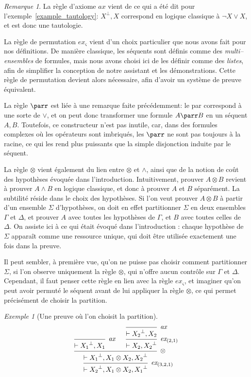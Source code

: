 \documentclass[11pt,a4paper]{article}
\theoremstyle{plain}
\theoremstyle{definition}
\theoremstyle{remark}
\newtheorem{remark}{Remarque}
\newtheorem{example}{Exemple}
\newcommand*{\orth}{^\perp}
\newcommand*{\tensor}{\otimes}
\newcommand*{\axv}[1]{\infer{0}[\ensuremath{\mathit{ax}}]{\vdash #1}}
\newcommand*{\tensorv}[1]{\infer{2}[\ensuremath{\tensor}]{\vdash #1}}
\newcommand*{\permv}[2]{\infer{1}[\ensuremath{\textit{ex}_{#1}}]{\vdash #2}}
\newcommand*{\someperm}{\varsigma}
\newcommand*{\sequent}{\Gamma}
\newcommand*{\sequentbis}{\Delta}
\begin{document}
\begin{remark}
    La règle d'axiome $\mathit{ax}$ vient de ce qui a été dit pour l'exemple~\ref{example_tautology}: $X\orth, X$ correspond en logique classique à $\neg X \lor X$, et est donc une tautologie.

    La règle de permutation $\textit{ex}_{\someperm}$ vient d'un choix particulier que nous avons fait pour nos définitions. De manière classique, les séquents sont définis comme des \textit{multi--ensembles} de formules, mais nous avons choisi ici de les définir comme des \textit{listes}, afin de simplifier la conception de notre assistant et les démonstrations. Cette règle de permutation devient alors nécessaire, afin d'avoir un système de preuve équivalent.
    
    La règle $\parr$ est liée à une remarque faite précédemment: le par correspond à une sorte de $\lor$, et on peut donc transformer une formule $A \parr B$ en un séquent $A, B$. Toutefois, ce constructeur n'est pas inutile, car, dans des formules complexes où les opérateurs sont imbriqués, les $\parr$ ne sont pas toujours à la racine, ce qui les rend plus puissants que la simple disjonction induite par le séquent.
    
    La règle $\tensor$ vient également du lien entre $\tensor$ et $\land$, ainsi que de la notion de coût des hypothèses évoquée dans l'introduction. Intuitivement, prouver $A \tensor B$ revient à prouver $A \land B$ en logique classique, et donc à prouver $A$ et $B$ séparément. La subtilité réside dans le choix des hypothèses. Si l'on veut prouver $A \tensor B$ à partir d'un ensemble $\Sigma$ d'hypothèses, on doit en effet partitionner $\Sigma$ en deux ensembles $\sequent$ et $\sequentbis$, et prouver $A$ avec toutes les hypothèses de $\sequent$, et $B$ avec toutes celles de $\sequentbis$. On assiste ici à ce qui était évoqué dans l'introduction : chaque hypothèse de $\Sigma$ apparaît comme une ressource unique, qui doit être utilisée exactement une fois dans la preuve. 
    
    Il peut sembler, à première vue, qu'on ne puisse pas choisir comment partitionner $\Sigma$, si l'on observe uniquement la règle $\tensor$, qui n'offre aucun contrôle sur $\sequent$ et $\sequentbis$. Cependant, il faut penser cette règle en lien avec la règle $\textit{ex}_{\someperm}$, et imaginer qu'on peut avoir permuté le séquent avant de lui appliquer la règle $\tensor$, ce qui permet précisément de choisir la partition.
    
    \begin{example}[Une preuve où l'on choisit la partition]
    \begin{equation*}
        \begin{prooftree}
            \axv{{X_1}\orth, X_1}
            \axv{{X_2}\orth, X_2}
            \permv{(2, 1)}{X_2, {X_2}\orth}
            \tensorv{{X_1}\orth, X_1 \tensor X_2, {X_2}\orth}
            \permv{(3, 2, 1)}{{X_2}\orth, X_1 \tensor X_2, {X_1}\orth}
        \end{prooftree}
    \end{equation*}
    \end{example}
\end{remark}
\end{document}
